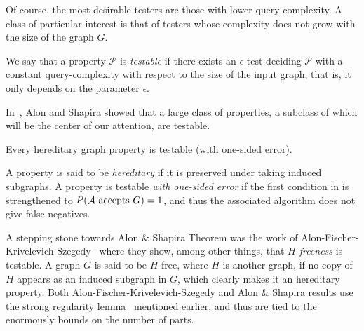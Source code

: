     Of course, the most desirable testers are those with lower query complexity.
    A class of particular interest is that of testers whose complexity does not grow with the size of the
    graph $G$.

    \begin{definition}
        We say that a property $\mathcal{P}$ is \emph{testable} if there exists an $\epsilon$-test deciding $\mathcal{P}$
        with a constant query-complexity with respect to the size of the input graph, that is, it only depends on the
        parameter $\epsilon$.
    \end{definition}

    In~\cite{a_characterization_of_the_natural_graph_properties_testable_with_one_sided_error}, Alon and Shapira
    showed that a large class of properties, a subclass of which will be the center of our attention, are testable.

    \begin{theorem}
        \label{thm:alon_and_shapira_theorem}
        Every hereditary graph property is testable (with one-sided error).
    \end{theorem}

    A property is said to be \emph{hereditary} if it is preserved under taking induced subgraphs.
    A property is testable \emph{with one-sided error} if the first condition in 
    is strengthened to $P( \mathcal{A} \text{ accepts } G ) = 1$, and thus the associated algorithm does
    not give false negatives.


    A stepping stone towards Alon \& Shapira Theorem was the work of
    Alon-Fischer-Krivelevich-Szegedy~\cite{efficient_testing_of_large_graphs} where they show, among other things,
    that \emph{$H$-freeness} is testable.
    A graph $G$ is said to be $H$-free, where $H$ is another graph, if no copy of $H$ appears as an induced subgraph in
    $G$, which clearly makes it an hereditary property.
    Both Alon-Fischer-Krivelevich-Szegedy and Alon \& Shapira results use the strong regularity lemma~\cite[Lemma 4.1]{efficient_testing_of_large_graphs}
    mentioned earlier, and thus are tied to the enormously bounds on the number of parts.

